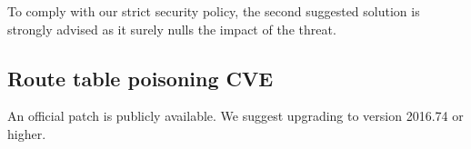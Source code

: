 To comply with our strict security policy, the second suggested solution is strongly advised as it surely nulls the impact of the threat.

\subsection*{Route table poisoning \- CVE}

An official patch is publicly available. We suggest upgrading to version 2016.74 or higher.\cite{online:mitigation-cve-2016-7406}
